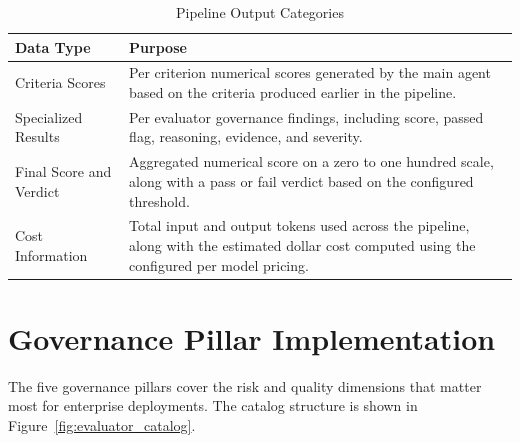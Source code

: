 \documentclass[12pt, a4paper, oneside]{report}
\begin{document}
\begin{table}[h]
\centering
\caption{Pipeline Output Categories}
\label{tab:pipeline-output}
\begin{tabular}{|p{6cm}|p{10cm}|}
\hline
\textbf{Data Type} & \textbf{Purpose} \\
\hline

Criteria Scores &
Per criterion numerical scores generated by the main agent based on the criteria produced earlier in the pipeline.
\\
\hline

Specialized Results &
Per evaluator governance findings, including score, passed flag, reasoning, evidence, and severity.
\\
\hline

Final Score and Verdict &
Aggregated numerical score on a zero to one hundred scale, along with a pass or fail verdict based on the configured threshold.
\\
\hline

Cost Information &
Total input and output tokens used across the pipeline, along with the estimated dollar cost computed using the configured per model pricing.
\\
\hline

\end{tabular}
\end{table}


\section{Governance Pillar Implementation}

The five governance pillars cover the risk and quality dimensions that matter most for enterprise deployments. The catalog structure is shown in Figure~\ref{fig:evaluator_catalog}.
\end{document}
